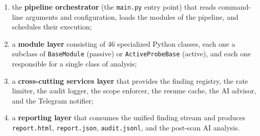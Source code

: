 \begin{enumerate}
  \item the \textbf{pipeline orchestrator} (the \texttt{main.py} entry point) that reads command-line arguments and configuration, loads the modules of the pipeline, and schedules their execution;
  \item a \textbf{module layer} consisting of 46 specialized Python classes, each one a subclass of \texttt{BaseModule} (passive) or \texttt{ActiveProbeBase} (active), and each one responsible for a single class of analysis;
  \item a \textbf{cross-cutting services layer} that provides the finding registry, the rate limiter, the audit logger, the scope enforcer, the resume cache, the AI advisor, and the Telegram notifier;
  \item a \textbf{reporting layer} that consumes the unified finding stream and produces \texttt{report.html}, \texttt{report.json}, \texttt{audit.jsonl}, and the post-scan AI analysis.
\end{enumerate}

